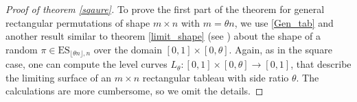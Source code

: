 \documentclass[11pt, a4paper]{article}
\theoremstyle{compact}
\newtheorem{theorem}{Theorem}[section]
\begin{document}
\begin{proof}[Proof of theorem \ref{sqaure}]
To prove the first part of the theorem for general rectangular permutations of shape $m\times n$ with $m=\theta n$, we use \ref{Gen_tab} and another result similar to theorem \ref{limit_shape} (see \cite{lim_shapes}) about the shape of a random $\pi\in\mathrm{ES}_{\lfloor\theta n\rfloor, n}$ over the domain $[0, 1] \times [0, \theta]$. 
Again, as in the square case, one can compute the level curves $L_\theta:[0,1] \times[0, \theta] \rightarrow[0,1]$, that describe the limiting surface of an $m\times n$ rectangular tableau with side ratio $\theta$. The calculations are more cumbersome, so we omit the details. 
\end{proof}
\end{document}
